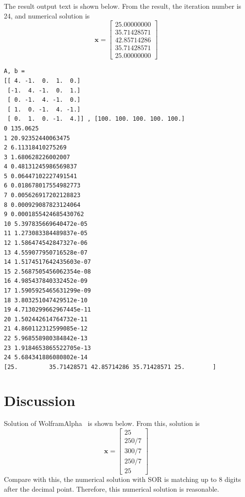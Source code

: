 \documentclass[a4paper,11pt]{article}
\begin{document}
The result output text is shown below. From the result, the iteration number is 24, and numerical solution is
\begin{equation}
	\bm{x} = \begin{bmatrix}
		25.00000000 \\
		35.71428571 \\
		42.85714286 \\
		35.71428571 \\
		25.00000000
	\end{bmatrix}
\end{equation}

\begin{lstlisting}[caption=Output text]
A, b = 
[[ 4. -1.  0.  1.  0.]
 [-1.  4. -1.  0.  1.]
 [ 0. -1.  4. -1.  0.]
 [ 1.  0. -1.  4. -1.]
 [ 0.  1.  0. -1.  4.]] , [100. 100. 100. 100. 100.]
0 135.0625
1 20.92352440063475
2 6.11318410275269
3 1.680628226002007
4 0.48131245986569837
5 0.06447102227491541
6 0.018678017554982773
7 0.005626917202128823
8 0.000929087823124064
9 0.0001855424685430762
10 5.397835669640472e-05
11 1.273083384489837e-05
12 1.586474542847327e-06
13 4.559077950716528e-07
14 1.5174517642435603e-07
15 2.5687505456062354e-08
16 4.985437840332452e-09
17 1.5905925465631299e-09
18 3.803251047429512e-10
19 4.7130299662967445e-11
20 1.502442614764732e-11
21 4.860112312599085e-12
22 5.968558980384842e-13
23 1.9184653865522705e-13
24 5.684341886080802e-14
[25.         35.71428571 42.85714286 35.71428571 25.        ]
\end{lstlisting}

\section{Discussion}
Solution of WolframAlpha~\cite{wolf} is shown below. From this, solution is 
\begin{equation}
	\bm{x} = \begin{bmatrix}
		25 \\
		250/7 \\
		300/7 \\
		250/7 \\
		25
	\end{bmatrix}
\end{equation}
Compare with this, the numerical solution with SOR is matching up to 8 digits after the decimal point. Therefore, this numerical solution is reasonable.
\end{document}
